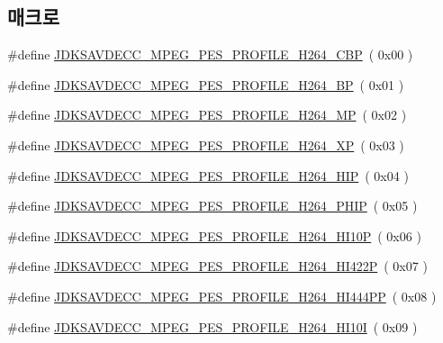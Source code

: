 \subsection*{매크로}
\begin{DoxyCompactItemize}
\item 
\#define \hyperlink{group__mpeg__pes__profile_ga6ff775a94214efb9fafe6b80bb5c2924}{J\+D\+K\+S\+A\+V\+D\+E\+C\+C\+\_\+\+M\+P\+E\+G\+\_\+\+P\+E\+S\+\_\+\+P\+R\+O\+F\+I\+L\+E\+\_\+\+H264\+\_\+\+C\+BP}~( 0x00 )
\item 
\#define \hyperlink{group__mpeg__pes__profile_ga15153a03be1434358c1ead098a5849fb}{J\+D\+K\+S\+A\+V\+D\+E\+C\+C\+\_\+\+M\+P\+E\+G\+\_\+\+P\+E\+S\+\_\+\+P\+R\+O\+F\+I\+L\+E\+\_\+\+H264\+\_\+\+BP}~( 0x01 )
\item 
\#define \hyperlink{group__mpeg__pes__profile_ga5fd00b875e0c5a28743c98ed14cae354}{J\+D\+K\+S\+A\+V\+D\+E\+C\+C\+\_\+\+M\+P\+E\+G\+\_\+\+P\+E\+S\+\_\+\+P\+R\+O\+F\+I\+L\+E\+\_\+\+H264\+\_\+\+MP}~( 0x02 )
\item 
\#define \hyperlink{group__mpeg__pes__profile_ga8b6d75e98951b90bcd319ddbc2289533}{J\+D\+K\+S\+A\+V\+D\+E\+C\+C\+\_\+\+M\+P\+E\+G\+\_\+\+P\+E\+S\+\_\+\+P\+R\+O\+F\+I\+L\+E\+\_\+\+H264\+\_\+\+XP}~( 0x03 )
\item 
\#define \hyperlink{group__mpeg__pes__profile_gab538d4c3e2b78cb59a3b20e019d157fc}{J\+D\+K\+S\+A\+V\+D\+E\+C\+C\+\_\+\+M\+P\+E\+G\+\_\+\+P\+E\+S\+\_\+\+P\+R\+O\+F\+I\+L\+E\+\_\+\+H264\+\_\+\+H\+IP}~( 0x04 )
\item 
\#define \hyperlink{group__mpeg__pes__profile_ga4b5421b4534f5470c9e98bed6a1dc5e3}{J\+D\+K\+S\+A\+V\+D\+E\+C\+C\+\_\+\+M\+P\+E\+G\+\_\+\+P\+E\+S\+\_\+\+P\+R\+O\+F\+I\+L\+E\+\_\+\+H264\+\_\+\+P\+H\+IP}~( 0x05 )
\item 
\#define \hyperlink{group__mpeg__pes__profile_gac997c43dacc4415ddd792f89737427c5}{J\+D\+K\+S\+A\+V\+D\+E\+C\+C\+\_\+\+M\+P\+E\+G\+\_\+\+P\+E\+S\+\_\+\+P\+R\+O\+F\+I\+L\+E\+\_\+\+H264\+\_\+\+H\+I10P}~( 0x06 )
\item 
\#define \hyperlink{group__mpeg__pes__profile_ga833417de753b8abfa489f03d32ad0d3d}{J\+D\+K\+S\+A\+V\+D\+E\+C\+C\+\_\+\+M\+P\+E\+G\+\_\+\+P\+E\+S\+\_\+\+P\+R\+O\+F\+I\+L\+E\+\_\+\+H264\+\_\+\+H\+I422P}~( 0x07 )
\item 
\#define \hyperlink{group__mpeg__pes__profile_gae8d6e7d287ef9022992d1d31b997a598}{J\+D\+K\+S\+A\+V\+D\+E\+C\+C\+\_\+\+M\+P\+E\+G\+\_\+\+P\+E\+S\+\_\+\+P\+R\+O\+F\+I\+L\+E\+\_\+\+H264\+\_\+\+H\+I444\+PP}~( 0x08 )
\item 
\#define \hyperlink{group__mpeg__pes__profile_ga0923d4f43e1ce3911e0e0246f50bbe1b}{J\+D\+K\+S\+A\+V\+D\+E\+C\+C\+\_\+\+M\+P\+E\+G\+\_\+\+P\+E\+S\+\_\+\+P\+R\+O\+F\+I\+L\+E\+\_\+\+H264\+\_\+\+H\+I10I}~( 0x09 )

\end{DoxyCompactItemize}

